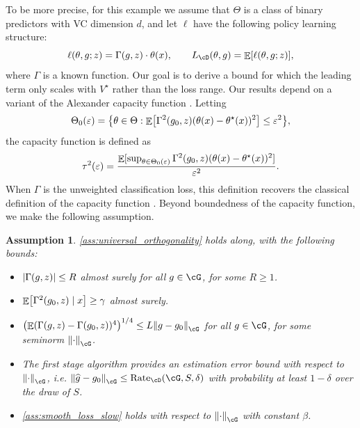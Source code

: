 \documentclass[11pt]{article} %
\newcommand{\pref}[1]{\cref{#1}}
\theoremstyle{theorem}  %
\newtheorem{assumption}{Assumption}
\theoremstyle{plain}
\DeclarePairedDelimiter{\abs}{\lvert}{\rvert} %
\DeclarePairedDelimiter{\brk}{[}{]}
\DeclarePairedDelimiter{\crl}{\{}{\}}
\DeclarePairedDelimiter{\prn}{(}{)}
\DeclarePairedDelimiter{\nrm}{\|}{\|}
\DeclareMathOperator{\En}{\mathbb{E}}
\newcommand{\ls}{\ell}
\newcommand{\veps}{\varepsilon}
\newcommand{\wh}[1]{\widehat{#1}}
\newcommand{\poprisk}{L_{\cD}}
\newcommand{\estone}{\wh{g}}
\newcommand{\nuisance}{\cG}
\newcommand{\target}{\Theta}
\newcommand{\Rate}{\mathrm{Rate}_{\cD}}
\newcommand{\besttwo}{\theta^{\star}}
\newcommand{\gtone}{g_0}
\newcommand{\targeteps}{\target_0(\veps)}
\begin{document}
To be more precise, for this example we assume that $\target$ is a class of binary predictors with VC dimension $d$, and let $\ls$ have the following policy learning structure:
\[
\ls(\theta,g;z) = \Gamma(g,z)\cdot\theta(x),\quad\quad\poprisk(\theta,g)=\En\brk{\ls(\theta,g;z)},
\]
where $\Gamma$ is a known function. Our goal is to derive a bound for which the leading term only scales with $V^{\star}$ rather than the loss range. Our results depend on a variant of the Alexander capacity function \citep{gine2006concentration,hanneke2014theory}. Letting \[\targeteps=\crl*{\theta\in\target:\En\brk*{\Gamma^2(\gtone,z)(\theta(x)-\besttwo(x))^{2}}\leq{}\veps^{2}},\] the capacity function is defined as
\begin{equation}
\tau^{2}(\veps) = \frac{\En\brk{\sup_{\theta\in\targeteps}\Gamma^{2}(\gtone,z)(\theta(x)-\besttwo(x))^{2}}}{\veps^{2}}.
\end{equation}
When $\Gamma$ is the unweighted classification loss, this definition recovers the classical definition of the capacity function \citep{gine2006concentration,hanneke2014theory}. Beyond boundedness of the capacity function, we make the following assumption.
\begin{assumption}
\label{ass:alexander}
\pref{ass:universal_orthogonality} holds along, with the following bounds:
\begin{itemize}
\item $\abs*{\Gamma(g,z)}\leq{}R$ almost surely for all $g\in\cG$, for some $R\geq{}1$.
\item $\En\brk*{\Gamma^{2}(g_0,z)\mid{}x}\geq{}\gamma$ almost surely.
\item $\prn*{\En(\Gamma(g,z)-\Gamma(g_0,z))^{4}}^{1/4}\leq{}L\nrm*{g-g_0}_{\nuisance}$ for all $g\in\nuisance$, for some seminorm $\nrm*{\cdot}_{\nuisance}$.
\item The first stage algorithm provides an estimation error bound with respect to $\nrm*{\cdot}_{\nuisance}$, i.e.
  $\nrm*{\estone-\gtone}_{\nuisance}\leq{}\Rate(\nuisance,S,\delta)$ with probability at least $1-\delta$ over the draw of $S$.
\item \pref{ass:smooth_loss_slow} holds with respect to $\nrm*{\cdot}_{\nuisance}$ with constant $\beta$.
\end{itemize}
\end{assumption}
\end{document}
